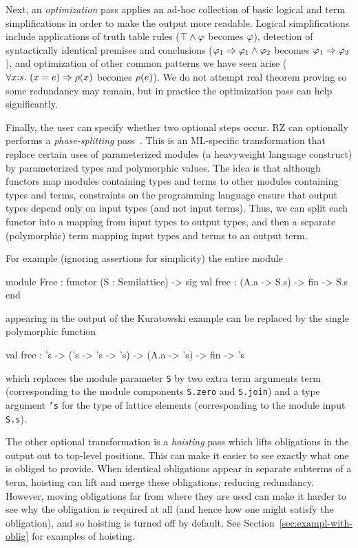 Next, an \emph{optimization} pass applies an ad-hoc collection of
basic logical and term simplifications in order to make the output more readable. 
Logical simplifications include applications of truth table rules
($\top\land \varphi$ becomes $\varphi$), detection of syntactically
identical premises and conclusions
($\varphi_1\Rightarrow \varphi_1\land \varphi_2$ becomes
$\varphi_1\Rightarrow \varphi_2$), and optimization of other common patterns we have
seen arise
($\forall x{:}s.\ (x = e)\Rightarrow \rho(x)$ becomes
$\rho(e)$). We do not attempt real theorem proving 
so some redundancy may remain, but in practice the optimization pass
can help significantly.

Finally, the user can specify whether two optional steps occur.
RZ can optionally performs a \emph{phase-splitting} pass~\cite{harper+:popl90}. 
This is an ML-specific transformation that replace certain
uses of parameterized modules (a heavyweight language construct) by
parameterized types and polymorphic values. The idea is that although
functors map modules containing types and terms to other modules containing types
and terms, constraints on the programming language ensure that output types
depend only on input types (and not input terms).  Thus, we can split each
functor into a mapping from input types to output types, and then a separate
(polymorphic) term mapping input types and terms to an output term.

For example (ignoring
assertions for simplicity) the entire module
\begin{source}
module Free : functor (S : Semilattice) ->
                    sig
                      val free : (A.a -> S.s) -> fin -> S.s
                    end	
\end{source}   
appearing in the output of the Kuratowski example can be replaced by the single polymorphic function
\begin{source}
val free : 's -> ('s -> 's -> 's) -> (A.a -> 's) -> fin -> 's	
\end{source}
which replaces the module parameter \texttt{S} by two extra term arguments term (corresponding to the module components \texttt{S.zero} and \texttt{S.join}) 
and a type argument \texttt{'s} for the type of lattice elements (corresponding to the module input \texttt{S.s}).

The other optional transformation is a \emph{hoisting} pass which
lifts obligations in the output out to top-level positions.  This can
make it easier to see exactly what one is obliged to provide.  When
identical obligations appear in separate subterms of a term, hoisting
can lift and merge these obligations, reducing redundancy.  However,
moving obligations far from where they are used can make it harder to
see why the obligation is required at all (and hence how one might
satisfy the obligation), and so hoisting is turned off by default. See
Section~\ref{sec:exampl-with-oblig} for examples of hoisting.

